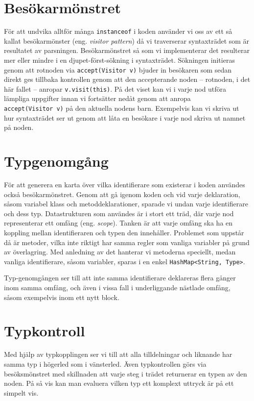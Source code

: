 \documentclass[a4paper,11pt]{article}
\newcommand{\trans}[2][eng.]{(#1 \emph{#2})}
\renewcommand{\*}[0]{\cdot}
\begin{document}
\section*{Besökarmönstret}

För att undvika alltför många \texttt{instanceof} i koden använder vi oss av
ett så kallat besökarmönster \trans{visitor pattern} då vi traverserar
syntaxträdet som är resultatet av parsningen. Besökarmönstret så som vi
implementerar det resulterar mer eller mindre i en djupet-först-sökning i
syntaxträdet. Sökningen initieras genom att rotnoden via
\texttt{accept(Visitor~v)} bjuder in besökaren som sedan direkt ges tillbaka
kontrollen genom att den accepterande noden -- rotnoden, i det här fallet --
anropar \texttt{v.visit(this)}. På det viset kan vi i varje nod utföra lämpliga
uppgifter innan vi fortsätter nedåt genom att anropa \texttt{accept(Visitor~v)}
på den aktuella nodens barn. Exempelvis kan vi skriva ut hur syntaxträdet ser
ut genom att låta en besökare i varje nod skriva ut namnet på noden.

\section*{Typgenomgång}

För att generera en karta över vilka identifierare som existerar i koden
användes också besökarmönstret. Genom att gå igenom koden och vid varje
deklaration, såsom variabel klass och metoddeklarationer, sparade vi undan
varje identifierare och dess typ. Datastrukturen som användes är i stort ett
träd, där varje nod representerar ett omfång \trans{scope}. Tanken är att varje
omfång ska ha en koppling mellan identifieraren och typen den innehåller.
Problemet som uppstår då är metoder, vilka inte riktigt har samma regler som
vanliga variabler på grund av överlagring. Med anledning av det hanterar vi
metoderna speciellt, medan vanliga identifierare, såsom variabler, sparas i en
enkel \texttt{HashMap<String, Type>}.

Typ-genomgången ser till att inte samma identifierare deklareras flera gånger
inom samma omfång, och även i vissa fall i underliggande nästlade omfång, såsom
exempelvis inom ett nytt block.

\section*{Typkontroll}

Med hjälp av typkopplingen ser vi till att alla tilldelningar och liknande har
samma typ i högerled som i vänsterled. Även typkontrollen görs via
besöksmönstret med skillnaden att varje steg i trädet returnerar en typen av
den noden. På så vis kan man evaluera vilken typ ett komplext uttryck är på ett
simpelt vis.
\end{document}
